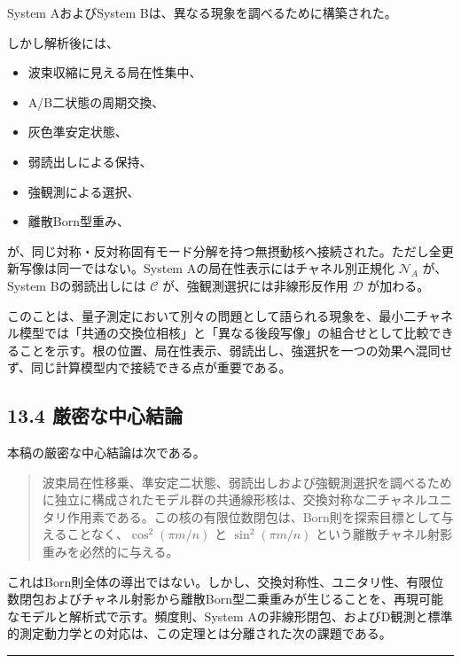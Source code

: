 \documentclass[
  a4paper,
  10pt]{article}
\providecommand{\tightlist}{%
  \setlength{\itemsep}{0pt}\setlength{\parskip}{0pt}}
\begin{document}
System AおよびSystem Bは、異なる現象を調べるために構築された。

しかし解析後には、

\begin{itemize}
\tightlist
\item
  波束収縮に見える局在性集中、
\item
  A/B二状態の周期交換、
\item
  灰色準安定状態、
\item
  弱読出しによる保持、
\item
  強観測による選択、
\item
  離散Born型重み、
\end{itemize}

が、同じ対称・反対称固有モード分解を持つ無摂動核へ接続された。ただし全更新写像は同一ではない。System
Aの局在性表示にはチャネル別正規化 \(\mathcal N_A\) が、System
Bの弱読出しには \(\mathcal C\) が、強観測選択には非線形反作用
\(\mathcal D\) が加わる。

このことは、量子測定において別々の問題として語られる現象を、最小二チャネル模型では「共通の交換位相核」と「異なる後段写像」の組合せとして比較できることを示す。根の位置、局在性表示、弱読出し、強選択を一つの効果へ混同せず、同じ計算模型内で接続できる点が重要である。

\subsection{13.4
厳密な中心結論}\label{134-ux53b3ux5bc6ux306aux4e2dux5fc3ux7d50ux8ad6}

本稿の厳密な中心結論は次である。

\begin{quote}
波束局在性移乗、準安定二状態、弱読出しおよび強観測選択を調べるために独立に構成されたモデル群の共通線形核は、交換対称な二チャネルユニタリ作用素である。この核の有限位数閉包は、Born則を探索目標として与えることなく、\(\cos^2(\pi m/n)\)
と \(\sin^2(\pi m/n)\) という離散チャネル射影重みを必然的に与える。
\end{quote}

これはBorn則全体の導出ではない。しかし、交換対称性、ユニタリ性、有限位数閉包およびチャネル射影から離散Born型二乗重みが生じることを、再現可能なモデルと解析式で示す。頻度則、System
Aの非線形閉包、およびD観測と標準的測定動力学との対応は、この定理とは分離された次の課題である。

\begin{center}\rule{0.5\linewidth}{0.5pt}\end{center}
\end{document}
